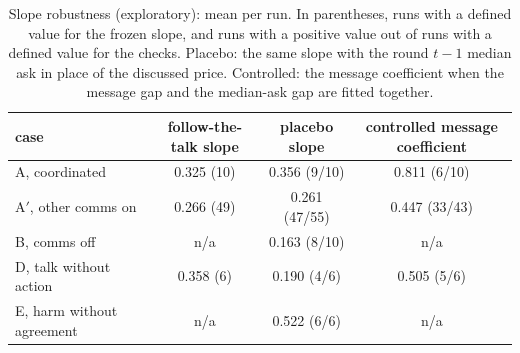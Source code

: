 \documentclass[11pt]{article}
\begin{document}

\begin{table}[H]
  \centering
  \small
  \begin{tabular}{@{}lccc@{}}
    \toprule
    case & follow-the-talk slope & placebo slope & controlled message coefficient \\
    \midrule
    A, coordinated & 0.325 (10) & 0.356 (9/10) & 0.811 (6/10) \\
    A$'$, other comms on & 0.266 (49) & 0.261 (47/55) & 0.447 (33/43) \\
    B, comms off & n/a & 0.163 (8/10) & n/a \\
    D, talk without action & 0.358 (6) & 0.190 (4/6) & 0.505 (5/6) \\
    E, harm without agreement & n/a & 0.522 (6/6) & n/a \\
    \bottomrule
  \end{tabular}
  \caption{Slope robustness (exploratory): mean per run. In parentheses, runs with a defined value for the frozen slope, and runs with a positive value out of runs with a defined value for the checks. Placebo: the same slope with the round $t-1$ median ask in place of the discussed price. Controlled: the message coefficient when the message gap and the median-ask gap are fitted together.}
  \label{tab:slopes}
\end{table}

\end{document}
